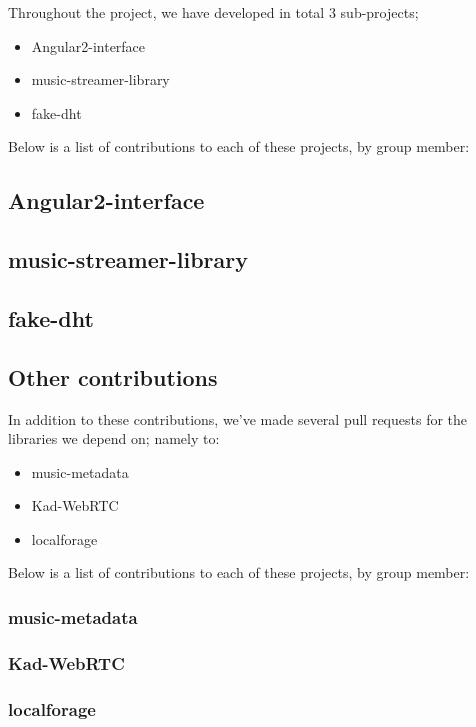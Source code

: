 Throughout the project, we have developed in total 3 sub-projects;
\begin{itemize}
\item Angular2-interface
\item music-streamer-library
\item fake-dht
\end{itemize}

Below is a list of contributions to each of these projects, by group member:
\subsection{Angular2-interface}

\subsection{music-streamer-library}

\subsection{fake-dht}

\subsection{Other contributions}
In addition to these contributions, we've made several pull requests for the
libraries we depend on; namely to:
\begin{itemize}
\item music-metadata
\item Kad-WebRTC
\item localforage
\end{itemize}

Below is a list of contributions to each of these projects, by group member:
\subsubsection{music-metadata}

\subsubsection{Kad-WebRTC}

\subsubsection{localforage}
